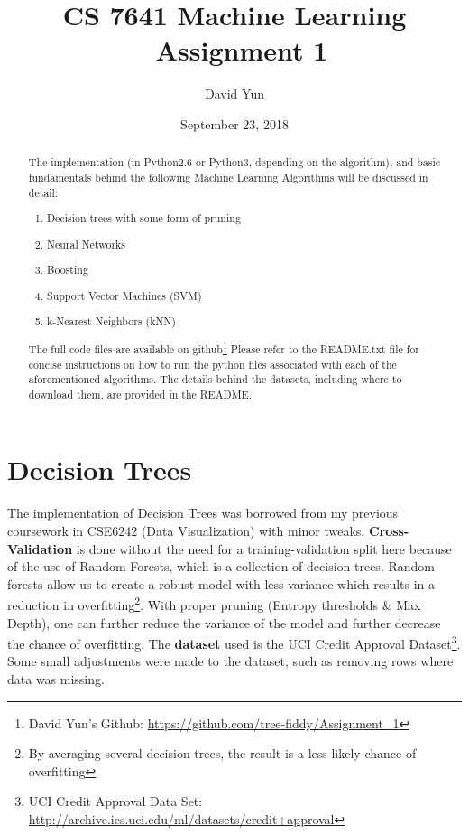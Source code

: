 \documentclass[letterpaper,12pt]{article}
\begin{document}
\title{CS 7641 Machine Learning \\
		\ Assignment 1 }
\author{David Yun}
\date{September 23, 2018}
\maketitle

\begin{abstract}
  The implementation (in Python2.6 or Python3, depending on the algorithm), and basic fundamentals behind the following Machine Learning Algorithms will be discussed in detail:  
  \begin{enumerate}
    \item Decision trees with some form of pruning
    \item Neural Networks
    \item Boosting
    \item Support Vector Machines (SVM)
    \item k-Nearest Neighbors (kNN)
      
    \end{enumerate}

    The full code files are available on github\footnote{David Yun's Github: \url{https://github.com/tree-fiddy/Assignment_1}}
    Please refer to the README.txt file for concise instructions on how to run the python files associated with each of the aforementioned algorithms.  The details behind the datasets, including where to download them, are provided in the README.  

\end{abstract}

\tableofcontents

\section{Decision Trees}

The implementation of Decision Trees was borrowed from my previous coursework in CSE6242 (Data Visualization) with minor tweaks.
\textbf{Cross-Validation} is done without the need for a training-validation split here because of the use of Random Forests, which is a collection of decision trees.  Random forests allow us to create a robust model with less variance which results in a reduction in overfitting\footnote{By averaging several decision trees, the result is a less likely chance of overfitting}.  With proper pruning (Entropy thresholds \& Max Depth), one can further reduce the variance of the model and further decrease the chance of overfitting.  The \textbf{dataset} used is the UCI Credit Approval Dataset\footnote{UCI Credit Approval Data Set: \url{http://archive.ics.uci.edu/ml/datasets/credit+approval}}.  Some small adjustments were made to the dataset, such as removing rows where data was missing.  
\end{document}
